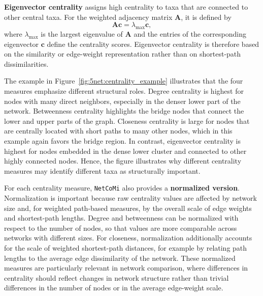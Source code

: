 \textbf{Eigenvector centrality} assigns high centrality to taxa that are connected to other central taxa. For the weighted adjacency matrix $\mathbf{A}$, it is defined by
\begin{equation}
\label{eq:5net:net_analysis:eigenvector}
\mathbf{A}\mathbf{c} = \lambda_{\max}\mathbf{c},
\end{equation}
where $\lambda_{\max}$ is the largest eigenvalue of $\mathbf{A}$ and the entries of the corresponding eigenvector $\mathbf{c}$ define the centrality scores. Eigenvector centrality is therefore based on the similarity or edge-weight representation rather than on shortest-path dissimilarities.

The example in Figure~\ref{fig:5net:centrality_example} illustrates that the four measures emphasize different structural roles. Degree centrality is highest for nodes with many direct neighbors, especially in the denser lower part of the network. Betweenness centrality highlights the bridge nodes that connect the lower and upper parts of the graph. Closeness centrality is large for nodes that are centrally located with short paths to many other nodes, which in this example again favors the bridge region. In contrast, eigenvector centrality is highest for nodes embedded in the dense lower cluster and connected to other highly connected nodes. Hence, the figure illustrates why different centrality measures may identify different taxa as structurally important.

For each centrality measure, \texttt{NetCoMi} also provides a \textbf{normalized version}. Normalization is important because raw centrality values are affected by network size and, for weighted path-based measures, by the overall scale of edge weights and shortest-path lengths. Degree and betweenness can be normalized with respect to the number of nodes, so that values are more comparable across networks with different sizes. For closeness, normalization additionally accounts for the scale of weighted shortest-path distances, for example by relating path lengths to the average edge dissimilarity of the network. These normalized measures are particularly relevant in network comparison, where differences in centrality should reflect changes in network structure rather than trivial differences in the number of nodes or in the average edge-weight scale.

